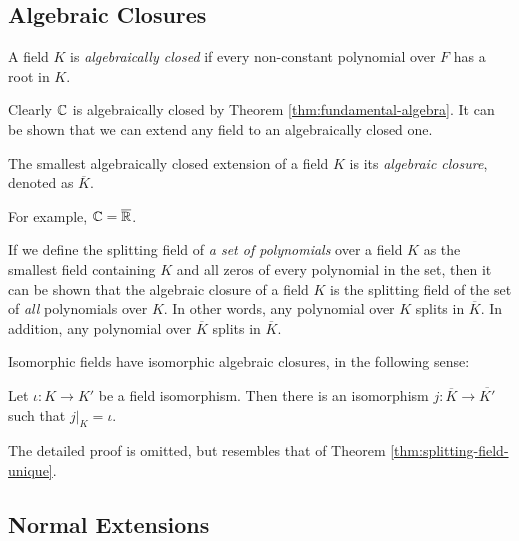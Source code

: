 \subsection{Algebraic Closures}
\begin{definition}
	A field $K$ is \textit{algebraically closed} if every non-constant polynomial over $F$ has a root in $K$. 
\end{definition}

Clearly $\mathbb C$ is algebraically closed by Theorem \ref{thm:fundamental-algebra}. It can be shown that we can extend any field to an algebraically closed one. 

\begin{definition}
	The smallest algebraically closed extension of a field $K$ is its \textit{algebraic closure}, denoted as $\overline K$.
\end{definition}

For example, $\mathbb C  = \overline {\mathbb R}$. 

If we define the splitting field of \textit{a set of polynomials} over a field $K$ as the smallest field containing $K$ and all zeros of every polynomial in the set, then it can be shown that the algebraic closure of a field $K$ is the splitting field of the set of \textit{all} polynomials over $K$. In other words, any polynomial over $K$ splits in $\overline K$. In addition, any polynomial over $\overline K$ splits in $\overline K$.

Isomorphic fields have isomorphic algebraic closures, in the following sense:

\begin{theorem} 
	Let $\iota: K \to K'$ be a field isomorphism. Then there is an isomorphism $j: \overline K \to \overline {K'}$ such that $j |_K = \iota$. 
\end{theorem}

The detailed proof is omitted, but resembles that of Theorem \ref{thm:splitting-field-unique}.

%



\subsection{Normal Extensions}


